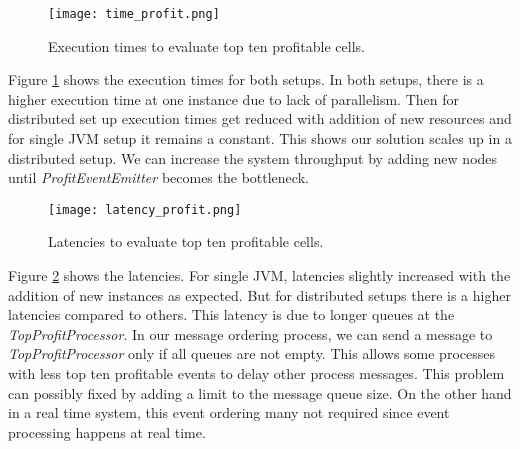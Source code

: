 \begin{figure}[!t]
        \centering
        \texttt{[image: time\_profit.png]}
        \caption{Execution times to evaluate top ten profitable cells.}
        \label{time_profit}
\end{figure}
 
Figure \ref{time_profit} shows the execution times for both setups. In both setups, there is a higher execution time at one instance due to lack of parallelism. Then for distributed set up execution times get reduced with addition of new resources and for single JVM setup it remains a constant. This shows our solution scales up in a distributed setup. We can increase the system throughput by adding new nodes until \textit{ProfitEventEmitter} becomes the bottleneck.


\begin{figure}[!t]
        \centering
        \texttt{[image: latency\_profit.png]}
        \caption{Latencies to evaluate top ten profitable cells.}
        \label{latency_profit}
\end{figure}

Figure \ref{latency_profit} shows the latencies. For single JVM, latencies slightly increased with the addition of new instances as expected. But for distributed setups there is a higher latencies compared to others. This latency is due to longer queues at the \textit{TopProfitProcessor}. In our message ordering process, we can send a message to \textit{TopProfitProcessor} only if all queues are not empty. This allows some processes with less top ten profitable events to delay other process messages. This problem can  possibly fixed by adding a limit to the message queue size. On the other hand in a real time system, this event ordering many not required since event processing happens at real time. 



